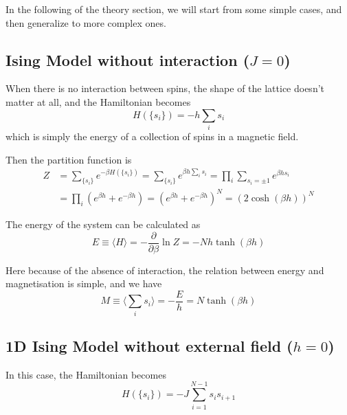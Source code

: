 \documentclass[11pt]{article}
\begin{document}

	In the following of the theory section, we will start from some simple cases, and then generalize to more complex ones.

	\subsection{Ising Model without interaction ($J=0$)}

	When there is no interaction between spins, the shape of the lattice doesn't matter at all, and the Hamiltonian becomes
	\begin{equation} \label{eq:HamiltonianNoInteraction}
		H(\{s_i\}) = -h \sum_i s_i
	\end{equation}
	which is simply the energy of a collection of spins in a magnetic field.

	Then the partition function is
	\begin{equation} \label{eq:PartitionFunctionNoInteraction}
		\begin{aligned}
			Z &= \sum_{\{s_i\}} e^{-\beta H(\{s_i\})} = \sum_{\{s_i\}} e^{\beta h \sum_i s_i} = \prod_i \sum_{s_i=\pm1} e^{\beta h s_i} \\
			&= \prod_i (e^{\beta h} + e^{-\beta h}) = (e^{\beta h} + e^{-\beta h})^N = (2\cosh(\beta h))^N
		\end{aligned}
	\end{equation}

	The energy of the system can be calculated as
	\begin{equation} \label{eq:EnergyNoInteraction}
		E \equiv \langle H \rangle = -\frac{\partial}{\partial \beta} \ln Z = - N h \tanh(\beta h)
	\end{equation}

	Here because of the absence of interaction, the relation between energy and magnetisation is simple, and we have
	\begin{equation} \label{eq:MagnetisationNoInteraction}
		M \equiv \langle \sum_i s_i \rangle = -\frac{E}{h} = N \tanh(\beta h)
	\end{equation}

	\subsection{1D Ising Model without external field ($h=0$)}


	In this case, the Hamiltonian becomes
	\begin{equation} \label{eq:Hamiltonian1DNoField}
		H(\{s_i\}) = -J \sum_{i=1}^{N-1} s_i s_{i+1}
	\end{equation}
\end{document}
